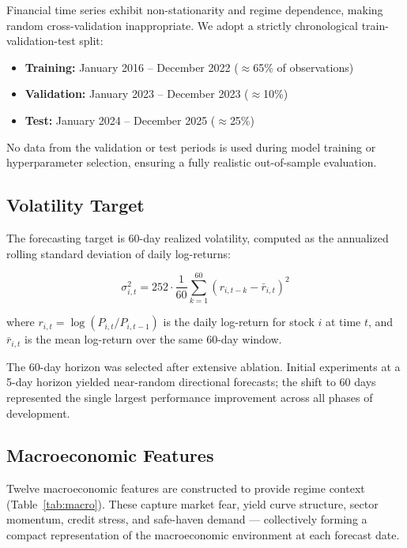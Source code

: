 \documentclass[12pt, a4paper]{article}
\begin{document}
Financial time series exhibit non-stationarity and regime dependence, making random cross-validation inappropriate. We adopt a strictly chronological train-validation-test split:

\begin{itemize}[noitemsep]
    \item \textbf{Training:} January 2016 -- December 2022 ($\approx$65\% of observations)
    \item \textbf{Validation:} January 2023 -- December 2023 ($\approx$10\%)
    \item \textbf{Test:} January 2024 -- December 2025 ($\approx$25\%)
\end{itemize}

No data from the validation or test periods is used during model training or hyperparameter selection, ensuring a fully realistic out-of-sample evaluation.

\subsection{Volatility Target}

The forecasting target is 60-day realized volatility, computed as the annualized rolling standard deviation of daily log-returns:

\begin{equation}
    \sigma^2_{i,t} = 252 \cdot \frac{1}{60} \sum_{k=1}^{60} \left( r_{i,t-k} - \bar{r}_{i,t} \right)^2
\end{equation}

where $r_{i,t} = \log(P_{i,t} / P_{i,t-1})$ is the daily log-return for stock $i$ at time $t$, and $\bar{r}_{i,t}$ is the mean log-return over the same 60-day window.

The 60-day horizon was selected after extensive ablation. Initial experiments at a 5-day horizon yielded near-random directional forecasts; the shift to 60 days represented the single largest performance improvement across all phases of development.

\subsection{Macroeconomic Features}

Twelve macroeconomic features are constructed to provide regime context (Table~\ref{tab:macro}). These capture market fear, yield curve structure, sector momentum, credit stress, and safe-haven demand --- collectively forming a compact representation of the macroeconomic environment at each forecast date.
\end{document}
